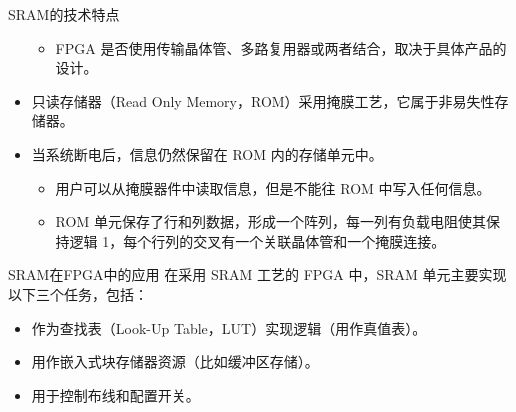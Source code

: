 \begin{frame}[allowframebreaks]{SRAM的技术特点}
\begin{itemize}
    \begin{itemize}
    \tightlist
    \item
    FPGA
    是否使用传输晶体管、多路复用器或两者结合，取决于具体产品的设计。
    \end{itemize}
\item
    只读存储器（Read Only
    Memory，ROM）采用掩膜工艺，它属于非易失性存储器。
\item
    当系统断电后，信息仍然保留在 ROM 内的存储单元中。

    \begin{itemize}
    \tightlist
    \item
    用户可以从掩膜器件中读取信息，但是不能往 ROM 中写入任何信息。
    \item
    ROM 单元保存了行和列数据，形成一个阵列，每一列有负载电阻使其保持逻辑
    1，每个行列的交叉有一个关联晶体管和一个掩膜连接。
    \end{itemize}
\end{itemize}
\end{frame}

\begin{frame}{SRAM在FPGA中的应用}
在采用 SRAM 工艺的 FPGA 中，SRAM 单元主要实现以下三个任务，包括：

\begin{itemize}
\tightlist
\item
    作为查找表（Look-Up Table，LUT）实现逻辑（用作真值表）。
\item
    用作嵌入式块存储器资源（比如缓冲区存储）。
\item
    用于控制布线和配置开关。
\end{itemize}
\end{frame}

